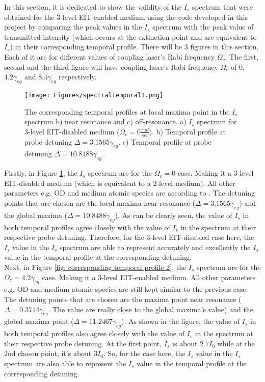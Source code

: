 In this section, it is dedicated to show the validity of the $I_{s}$ spectrum that were obtained for the 3-level EIT-enabled medium using the code developed in this project by comparing the peak values in the $I_{s}$ spectrum with the peak value of transmitted intensity (which occurs at the extinction point and are equivalent to $I_{s}$) in their corresponding temporal profile. There will be 3 figures in this section. Each of it are for different values of coupling laser's Rabi frequency $\Omega_{c}$. The first, second and the third figure will have coupling laser's Rabi frequency $\Omega_{c}$ of $0$, $4.2\gamma_{eg}$ and $8.4\gamma_{eg}$ respectively.

\newpage

\begin{figure}[h!]
    \centering
    \texttt{[image: Figures/spectralTemporal1.png]}
    \caption{The corresponding temporal profiles at local maxima point in the $I_{s}$ spectrum b) near resonance and c) off-resonance. a) $I_{s}$ spectrum for 3-level EIT-disabled medium ($\Omega_{c} = 0 \frac{rad}{sec}$). b)  Temporal profile at probe detuning $\Delta = 3.1565\gamma_{eg}$. c) Temporal profile at probe detuning $\Delta = 10.8488\gamma_{eg}$.}
    \label{fig: corresponding temporal profile 1}
\end{figure}

Firstly, in Figure \ref{fig: corresponding temporal profile 1}, the $I_{s}$ spectrum are for the $\Omega_{c} = 0$ case. Making it a 3-level EIT-disabled medium (which is equivalent to a 2-level medium). All other parameters e.g. OD and medium atomic species are according to \cite{jeong2010slow}. The detuning points that are chosen are the local maxima near resonance ($\Delta = 3.1565\gamma_{eg}$) and the global maxima ($\Delta = 10.8488\gamma_{eg}$). As can be clearly seen, the value of $I_{s}$ in both temporal profiles agree closely with the value of $I_{s}$ in the spectrum at their respective probe detuning. Therefore, for the 3-level EIT-disabled case here, the $I_{s}$ value in the $I_{s}$ spectrum are able to represent accurately and excellently the $I_{s}$ value in the temporal profile at the corresponding detuning.\\

Next, in Figure \ref{fig: corresponding temporal profile 2}, the $I_{s}$ spectrum are for the $\Omega_{c} = 4.2\gamma_{eg}$ case. Making it a 3-level EIT-enabled medium. All other parameters e.g. OD and medium atomic species are still kept similar to the previous case. The detuning points that are chosen are the maxima point near resonance ($\Delta = 0.3714\gamma_{eg}$. The value are really close to the global maxima's value) and the global maxima point ($\Delta = 11.2467\gamma_{eg}$). As shown in the figure, the value of $I_{s}$ in both temporal profiles also agree closely with the value of $I_{s}$ in the spectrum at their respective probe detuning. At the first point, $I_{s}$ is about $2.7I_{0}$ while at the 2nd chosen point, it's about $3I_{0}$. So, for the case here, the $I_{s}$ value in the $I_{s}$ spectrum are also able to represent the $I_{s}$ value in the temporal profile at the corresponding detuning.

